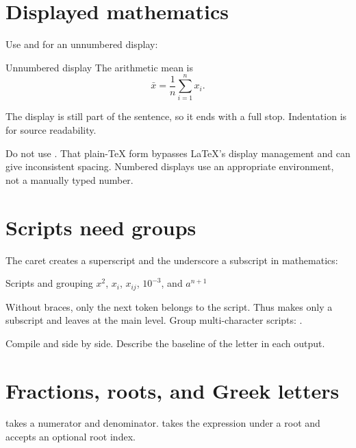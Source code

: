 \section{Displayed mathematics}

Use \code{\textbackslash[} and \code{\textbackslash]} for an unnumbered
display:

\begin{latexcode}{Unnumbered display}
The arithmetic mean is
\[
  \bar{x} = \frac{1}{n}\sum_{i=1}^{n} x_i.
\]
\end{latexcode}

The display is still part of the sentence, so it ends with a full stop.
Indentation is for source readability.

Do not use . That plain-TeX form bypasses \LaTeX{}'s display
management and can give inconsistent spacing. Numbered displays use an
appropriate environment, not a manually typed number.

\section{Scripts need groups}

The caret creates a superscript and the underscore a subscript in mathematics:

\begin{latexcode}{Scripts and grouping}
$x^2$, $x_i$, $x_{ij}$, $10^{-3}$, and $a^{n+1}$
\end{latexcode}

Without braces, only the next token belongs to the script. Thus
 makes only  a subscript and leaves  at the main
level. Group multi-character scripts: .

\begin{tryit}
Compile  and  side by side. Describe the
baseline of the letter  in each output.
\end{tryit}

\section{Fractions, roots, and Greek letters}

 takes a numerator and denominator.  takes the expression
under a root and accepts an optional root index.


